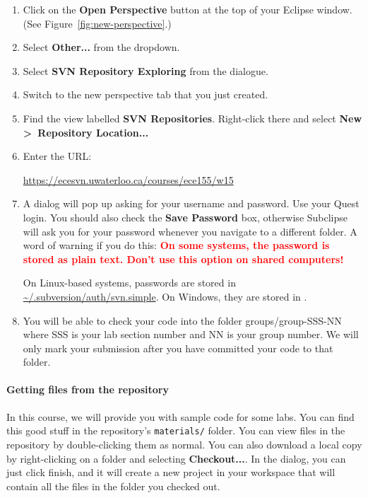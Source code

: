 \documentclass[10pt]{article}
\begin{document}
\begin{enumerate}
\item Click on the \textbf{Open Perspective} button at the top of your Eclipse window. (See Figure~\ref{fig:new-perspective}.)
\item Select \textbf{Other...} from the dropdown.
\item Select \textbf{SVN Repository Exploring} from the dialogue.
\item Switch to the new perspective tab that you just created.
\item Find the view labelled \textbf{SVN Repositories}. Right-click there and select \textbf{New \textgreater~Repository Location...}
\item Enter the URL:

\qquad \url{https://ecesvn.uwaterloo.ca/courses/ece155/w15} 
\item A dialog will pop up asking for your username and password. Use your Quest login. You should also check the \textbf{Save Password} box, otherwise Subclipse will ask you for your password whenever you navigate to a different folder. A word of warning if you do this: \textcolor{Red}{\textbf{On some systems, the password is stored as plain text. Don't use this option on shared computers!}}

On Linux-based systems, passwords are stored in \url{~/.subversion/auth/svn.simple}. On Windows, they are stored in .

\item You will be able to check your code into the folder groups/group-SSS-NN where SSS is your lab section number and NN is your group number. We will only mark your submission after you have committed your code to that folder.
\end{enumerate}

\paragraph{Getting files from the repository} In this course, we will provide you with sample code for some labs. You can find this good stuff in the repository's {\tt materials/} folder. You can view files in the repository by double-clicking them as normal. You can also download a local copy by right-clicking on a folder and selecting \textbf{Checkout...}. In the dialog, you can just click finish, and it will create a new project in your workspace that will contain all the files in the folder you checked out.
\end{document}
